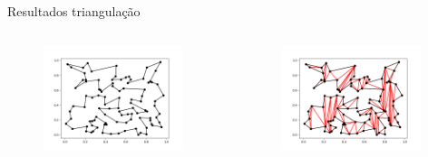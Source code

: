 \documentclass[aspectratio=169,usenames,dvipsnames]{beamer}
\begin{document}
\begin{frame}{Resultados triangulação}
  \begin{columns}
    \begin{center}
      \begin{figure}
        \includegraphics[width=0.95\textwidth]{figures/polygon_100_1.png}
      \end{figure}
    \end{center}
    \begin{center}
      \begin{figure}
        \includegraphics[width=0.95\textwidth]{figures/polygon_100_1_trig.png}
      \end{figure}
    \end{center}
  \end{columns}
\end{frame}
\end{document}
